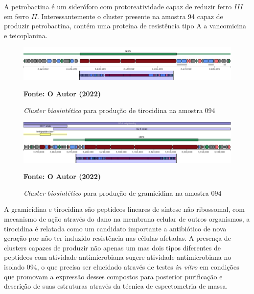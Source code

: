 A petrobactina é um sideróforo com protoreatividade capaz de reduzir ferro $III$ em 
ferro $II$\cite{barbeau2002petrobactin}. Interessantemente o cluster presente na amostra 94
capaz de produzir petrobactina, contém uma proteína de resistência tipo A a vancomicina e teicoplanina.

\begin{figure}[H]
	\caption{\textit{Cluster biosintético} para produção de tirocidina na amostra 094}
	\label{fig:quast_16}
	\centering
		\includegraphics[width=0.8\linewidth]{imagens/antismash/094regiao2.png} \\
	\centering
    \begin{small}\textbf{Fonte: O Autor (2022)}\end{small}
\end{figure}
\vspace{\floatsep}

\begin{figure}[H]
	\caption{\textit{Cluster biosintético} para produção de gramicidina na amostra 094}
	\label{fig:quast_16}
	\centering
		\includegraphics[width=0.8\linewidth]{imagens/antismash/094regiao3.png} \\
	\centering
    \begin{small}\textbf{Fonte: O Autor (2022)}\end{small}
\end{figure}
\vspace{\floatsep}

A gramicidina e tirocidina são peptídeos lineares de síntese não ribossomal, com mecanismo de ação
através do dano na membrana celular de outros organismos, a tirocidina é relatada como um candidato importante
a antibiótico de nova geração por não ter induzido resistência nas células afetadas\cite{yang2018antimicrobial}.
A presença de clusters capazes de produzir não apenas um mas dois tipos diferentes de peptídeos com
atividade antimicrobiana sugere atividade antimicrobiana no isolado 094, o que precisa ser elucidado através
de testes \textit{in vitro} em condições que promovam a expressão desses compostos para posterior purificação e
descrição de suas estruturas através da técnica de espectometria de massa.

